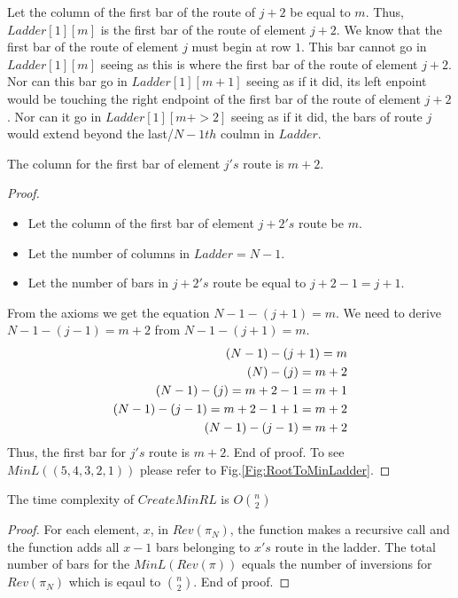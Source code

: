 Let the column of the first bar of the route of $j+2$ be equal to $m$. Thus, $Ladder[1][m]$ is the first bar 
of the route of element $j+2$. We know that the first bar of the route of element $j$ must begin at row $1$. 
This bar cannot go in $Ladder[1][m]$ seeing as this is where the first bar of the route of element $j+2$. 
Nor can this bar go in $Ladder[1][m+1]$ seeing as if it did, its left enpoint would be touching the right 
endpoint of the first bar of the route of element $j+2$. Nor can it go in $Ladder[1][m+>2]$ seeing as if it 
did, the bars of route $j$ would extend beyond the last/$N-1th$ coulmn in $Ladder$. 
\begin{lemma}
    The column for the first bar of element $j's$ route is $m+2$.
    
\end{lemma}
\begin{proof}
    \begin{itemize}
        \item     Let the column of the first bar of element $j+2's$ route be $m$. 
        \item     Let the number of columns in $Ladder=N-1$.
        \item     Let the number of bars in $j+2's$ route be equal to $j+2-1=j+1$.
    \end{itemize}
        From the axioms we get the equation $N-1-(j+1)=m$.
        We need to derive $N-1-(j-1)=m+2$ from $N-1-(j+1)=m$.
   \begin{equation} \label{eq1}
        \centering
        \begin{split}
            (N-1)-(j+1)=m \\
            (N)-(j)= m+2\\
            (N-1)-(j)=m+2-1=m+1 \\ 
            (N-1)-(j-1)=m+2-1+1=m+2\\
            (N-1)-(j-1) = m+2\\
        \end{split}
    \end{equation}
   Thus, the first bar for $j's$ route is $m+2$.
   End of proof. To see $MinL((5,4,3,2,1))$ please refer to Fig.\ref{Fig:RootToMinLadder}.
\end{proof}


\begin{lemma}
    The time complexity of $CreateMinRL$ is $O{n \choose 2}$ 
\end{lemma}
\begin{proof}
    For each element, $x$, in $Rev(\pi_{N})$, the function makes a recursive call and the function 
    adds all $x-1$ bars belonging to $x's$ route in the ladder. The total number of bars for the $MinL(Rev(\pi))$
    equals the number of inversions for $Rev(\pi_{N})$ which is eqaul to ${n \choose 2}$. End of proof.
\end{proof}



